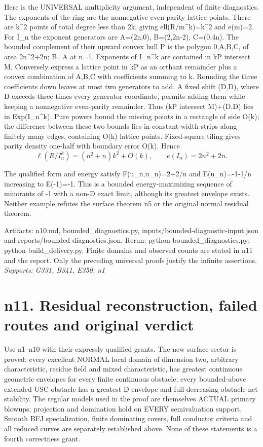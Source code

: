 \documentclass[11pt]{article}
\begin{document}
Here is the UNIVERSAL multiplicity argument, independent of finite diagnostics. The exponents of the ring are the nonnegative even-parity lattice points. There are k\textasciicircum{}2 points of total degree less than 2k, giving ell(R/m\textasciicircum{}k)=k\textasciicircum{}2 and e(m)=2. For I\_n the exponent generators are A=(2n,0), B=(2,2n-2), C=(0,4n). The bounded complement of their upward convex hull P is the polygon 0,A,B,C, of area 2n\textasciicircum{}2+2n; B=A at n=1. Exponents of I\_n\textasciicircum{}k are contained in kP intersect M. Conversely express a lattice point in kP as an orthant remainder plus a convex combination of A,B,C with coefficients summing to k. Rounding the three coefficients down leaves at most two generators to add. A fixed shift (D,D), where D exceeds three times every generator coordinate, permits adding them while keeping a nonnegative even-parity remainder. Thus (kP intersect M)+(D,D) lies in Exp(I\_n\textasciicircum{}k). Pure powers bound the missing points in a rectangle of side O(k); the difference between these two bounds lies in constant-width strips along finitely many edges, containing O(k) lattice points. Fixed-square tiling gives parity density one-half with boundary error O(k). Hence
\[
\ell(R/I_n^k)=(n^2+n)k^2+O(k),\qquad e(I_n)=2n^2+2n.
\]

The qualified form and energy satisfy F(u\_n,u\_n)=2+2/n and E(u\_n)=-1-1/n increasing to E(-1)=-1. This is a bounded energy-maximizing sequence of minorants of -1 with a non-D exact limit, although its greatest envelope exists. Neither example refutes the surface theorem n5 or the original normal residual theorem.

Artifacts: n10.md, bounded\_diagnostics.py, inputs/bounded-diagnostic-input.json and reports/bounded-diagnostics.json. Rerun: python bounded\_diagnostics.py; python build\_delivery.py. Finite domains and observed counts are stated in n11 and the report. Only the preceding universal proofs justify the infinite assertions.
\textit{Supports: G331, B341, E350, n1}

\section{n11. Residual reconstruction, failed routes and original verdict}

Use n1--n10 with their expressly qualified grants. The new surface sector is proved: every excellent NORMAL local domain of dimension two, arbitrary characteristic, residue field and mixed characteristic, has greatest continuous geometric envelopes for every finite continuous obstacle; every bounded-above extended USC obstacle has a greatest D-envelope and full decreasing-obstacle net stability. The regular models used in the proof are themselves ACTUAL primary blowups; projection and domination hold on EVERY semivaluation support. Smooth BFJ specialization, finite dominating covers, full conductor criteria and all reduced curves are separately established above. None of these statements is a fourth correctness grant.
\end{document}
